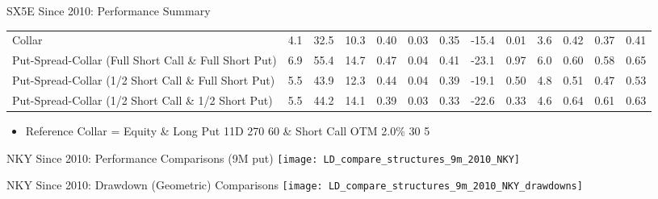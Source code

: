 \documentclass{beamer}
\begin{document}
\begin{frame}{SX5E Since 2010: Performance Summary}
{\begin{tabular}{lrrrrrrrrrrrr}
Collar & 4.1 & 32.5 & 10.3 & 0.40 & 0.03 & 0.35 & -15.4 & 0.01 & 3.6 & 0.42 & 0.37 & 0.41\\
Put-Spread-Collar (Full Short Call \& Full Short Put) & 6.9 & 55.4 & 14.7 & 0.47 & 0.04 & 0.41 & -23.1 & 0.97 & 6.0 & 0.60 & 0.58 & 0.65\\
Put-Spread-Collar (1/2 Short Call \& Full Short Put) & 5.5 & 43.9 & 12.3 & 0.44 & 0.04 & 0.39 & -19.1 & 0.50 & 4.8 & 0.51 & 0.47 & 0.53\\
Put-Spread-Collar (1/2 Short Call \& 1/2 Short Put) & 5.5 & 44.2 & 14.1 & 0.39 & 0.03 & 0.33 & -22.6 & 0.33 & 4.6 & 0.64 & 0.61 & 0.63\\
\midrule
\bottomrule
\end{tabular}

}

\begin{itemize}
\item {\footnotesize Reference Collar = Equity \& Long Put 11D 270 60 \& Short Call OTM 2.0\% 30 5}
\end{itemize}

\end{frame}

\begin{frame}{NKY Since 2010: Performance Comparisons (9M put)}
\texttt{[image: LD\_compare\_structures\_9m\_2010\_NKY]}
\end{frame}

\begin{frame}{NKY Since 2010: Drawdown (Geometric) Comparisons}
\texttt{[image: LD\_compare\_structures\_9m\_2010\_NKY\_drawdowns]}
\end{frame}
\end{document}
